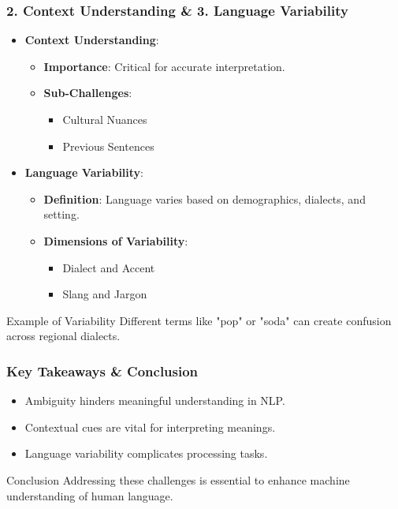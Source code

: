 \documentclass[aspectratio=169]{beamer}
\begin{document}
\begin{frame}[fragile]
    \frametitle{2. Context Understanding \& 3. Language Variability}
    \begin{itemize}
        \item \textbf{Context Understanding}:
        \begin{itemize}
            \item \textbf{Importance}: Critical for accurate interpretation.
            \item \textbf{Sub-Challenges}:
            \begin{itemize}
                \item Cultural Nuances
                \item Previous Sentences
            \end{itemize}
        \end{itemize}
        \item \textbf{Language Variability}:
        \begin{itemize}
            \item \textbf{Definition}: Language varies based on demographics, dialects, and setting.
            \item \textbf{Dimensions of Variability}:
            \begin{itemize}
                \item Dialect and Accent
                \item Slang and Jargon
            \end{itemize}
        \end{itemize}
    \end{itemize}
    \begin{block}{Example of Variability}
        Different terms like "pop" or "soda" can create confusion across regional dialects.
    \end{block}
\end{frame}

\begin{frame}[fragile]
    \frametitle{Key Takeaways \& Conclusion}
    \begin{itemize}
        \item Ambiguity hinders meaningful understanding in NLP.
        \item Contextual cues are vital for interpreting meanings.
        \item Language variability complicates processing tasks.
    \end{itemize}
    \begin{block}{Conclusion}
        Addressing these challenges is essential to enhance machine understanding of human language.
    \end{block}
\end{frame}
\end{document}
